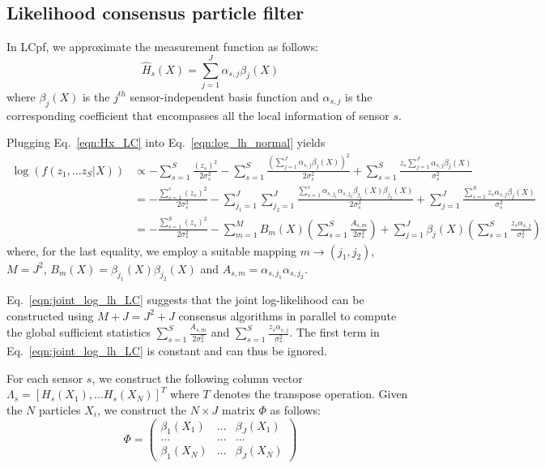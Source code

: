 \documentclass[10pt,letterpaper,final]{article}
\begin{document}
\subsection{Likelihood consensus particle filter}
In LCpf, we approximate the measurement function as follows:
\begin{equation}
\hat{H}_s(X) = \sum_{j=1}^J \alpha_{s,j} \beta_j(X)
\label{eqn:Hx_LC}
\end{equation}
where $\beta_j(X)$ is the $j^{th}$ sensor-independent basis function and $\alpha_{s,j}$ is the corresponding coefficient that encompasses all the local information of sensor $s$. %

Plugging Eq.~\eqref{eqn:Hx_LC} into Eq.~\eqref{eqn:log_lh_normal} yields
\begin{align}
\log(f(z_1,...z_S|X)) &\propto -\sum_{s=1}^S \frac{(z_s)^2}{2\sigma_s^2} -\sum_{s=1}^S \frac{\left( \sum_{j=1}^J \alpha_{s,j} \beta_j(X)\right)^2}{2\sigma_s^2} + \sum_{s=1}^S \frac{z_s\sum_{j=1}^J \alpha_{s,j} \beta_j(X)}{\sigma_s^2} \nonumber \\
&= -\frac{\sum_{s=1}^s(z_s)^2}{2\sigma_s^2} - \sum_{j_1=1}^J\sum_{j_2=1}^J\frac{\sum_{s=1}^s \alpha_{s,j_1}\alpha_{s,j_2} \beta_{j_1}(X)\beta_{j_2}(X)}{2\sigma_s^2}+ \sum_{j=1}^J\frac{\sum_{s=1}^S z_s \alpha_{s,j} \beta_j(X)}{\sigma_s^2} \nonumber \\
&= -\frac{\sum_{s=1}^S(z_s)^2}{2\sigma_s^2} - \sum_{m=1}^MB_{m}(X)\left(\sum_{s=1}^S\frac{A_{s,m} }{2\sigma_s^2}\right)+ \sum_{j=1}^J\beta_j(X)\left(\sum_{s=1}^S\frac{z_s \alpha_{s,j} }{\sigma_s^2}\right)
\label{eqn:joint_log_lh_LC}
\end{align}
where, for the last equality, we employ a suitable mapping $m\rightarrow (j_1,j_2)$, $M=J^2$, $B_m(X)=\beta_{j_1}(X)\beta_{j_2}(X)$ and $A_{s,m} = \alpha_{s,j_1}\alpha_{s,j_2}$. 

Eq.~\eqref{eqn:joint_log_lh_LC} suggests that the joint log-likelihood can be constructed using $M+J = J^2+J$ consensus algorithms in parallel to compute the global sufficient statistics $\sum_{s=1}^S \frac{A_{s,m}}{2\sigma_s^2}$ and $\sum_{s=1}^S \frac{z_s\alpha_{s,j}}{\sigma_s^2}$. The first term in Eq.~\eqref{eqn:joint_log_lh_LC} is constant and can thus be ignored. 


For each sensor $s$, we construct the following column vector $\Lambda_s = [ H_s(X_1), ... H_s(X_N)  ]^T$ where $T$ denotes the transpose operation. Given the $N$ particles $X_i$, we construct the $N\times J$ matrix $\Phi$ as follows:
\begin{equation}
\Phi=\left(
\begin{array}{ccc}
\beta_1(X_1) & ... & \beta_J(X_1) \\
... & ... & ... \\
\beta_1(X_N) & ... & \beta_J(X_N)
\end{array}
\right)
\label{eqn:beta_matrix}
\end{equation}
\end{document}
